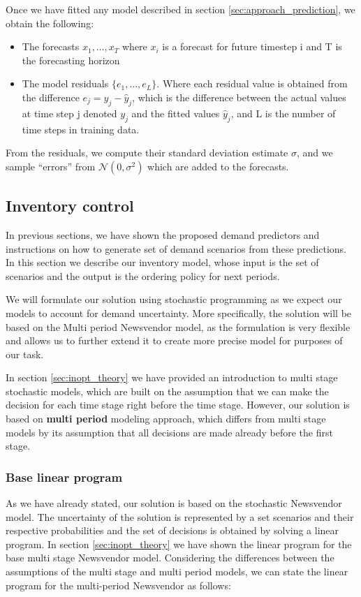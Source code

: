 \documentclass[11pt,a4paper]{article}
\begin{document}
Once we have fitted any model described in section \ref{sec:approach_prediction}, we obtain the following:

\begin{itemize}
\item The forecasts $x_1,\dots,x_T$ where $x_i$ is a forecast for future timestep i and T is the forecasting horizon
\item The model residuals $\{e_{1},\dots,e_{L}\}$. Where each residual value is obtained from the difference $e_{j} =
y_{j}-\hat{y}_{j}$, which is the difference between the actual values at time step j denoted $y_{j}$ and the fitted values $\hat{y}_{j}$, and L is the number of time steps in training data.
\end{itemize}

From the residuals, we compute their standard deviation estimate $\sigma$, and we sample ``errors'' from $\mathcal{N}(0, \sigma^2)$ which are added to the forecasts.


\subsection{Inventory control}
\label{sec:sol_inopt}
In previous sections, we have shown the proposed demand predictors and instructions on how to generate set of demand scenarios from these predictions. In this section we describe our inventory model, whose input is the set of scenarios and the output is the ordering policy for next periods.


We will formulate our solution using stochastic programming as we expect our models to account for demand uncertainty. More specifically, the solution will be based on the Multi period Newsvendor model, as the formulation is very flexible and allows us to further extend it to create more precise model for purposes of our task.

In section \ref{sec:inopt_theory} we have provided an introduction to multi stage stochastic models, which are built on the assumption that we can make the decision for each time stage right before the time stage. However, our solution is based on \textbf{multi period} modeling approach, which differs from multi stage models by its assumption that all decisions are made already before the first stage. 

\subsubsection{Base linear program}
As we have already stated, our solution is based on the stochastic Newsvendor model. The uncertainty of the solution is represented by a set scenarios and their respective probabilities and the set of decisions is obtained by solving a linear program. In section \ref{sec:inopt_theory} we have shown the linear program for the base multi stage Newsvendor model. Considering the differences between the assumptions of the multi stage and multi period models, we can state the linear program for the multi-period Newsvendor as follows: 
\end{document}
